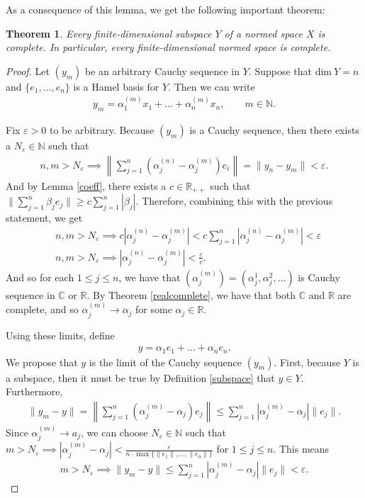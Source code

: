\documentclass[11pt]{article}
\theoremstyle{mystyle}
\newtheorem{thm}{Theorem}[section]
\newcommand{\0}{\mathbf{0}}
\begin{document}
As a consequence of this lemma, we get the following important theorem: 
\begin{thm}\label{finitecomplete}
Every finite-dimensional subspace $Y$ of a normed space $X$ is complete. In particular, every finite-dimensional normed space is complete.
\end{thm}
\begin{proof}
Let $(y_m)$ be an arbitrary Cauchy sequence in $Y$. Suppose that $\text{dim}\ Y = n$ and $\{e_1, \ldots, e_n\}$ is a Hamel basis for $Y$. Then we can write
\begin{align*}
    y_m = \alpha_1^{(m)}x_1 + \ldots + \alpha_n^{(m)}x_n, \qquad m \in \mathbb{N}. 
\end{align*}

Fix $\varepsilon > 0$ to be arbitrary. Because $(y_m)$ is a Cauchy sequence, then there exists a $N_{\varepsilon} \in \mathbb{N}$ such that
\begin{align*}
    n, m > N_{\varepsilon} \implies \left\|\sum_{j=1}^n (\alpha_j^{(n)} - \alpha_j^{(m)})e_i \right\| = \|y_n - y_m\| < \varepsilon.
\end{align*}
And by Lemma \ref{coeff}, there exists a $c \in \mathbb{R}_{++}$ such that $\|\sum_{j=1}^n \beta_j e_j\| \geq c\sum_{j=1}^n |\beta_j|$. Therefore, combining this with the previous statement, we get
\begin{align*}
    &n, m > N_{\varepsilon} \implies c|\alpha_j^{(n)} - \alpha_j^{(m)}| <  c\sum_{j=1}^n|\alpha_j^{(n)} - \alpha_j^{(m)}| < \varepsilon\\
    &n, m > N_{\varepsilon} \implies |\alpha_j^{(n)} - \alpha_j^{(m)}| < \frac{\varepsilon}{c}.
\end{align*}
And so for each $1 \leq j \leq n$, we have that $\left(\alpha_j^{(m)} \right) = (\alpha_j^{1}, \alpha_j^{2}, \ldots)$ is Cauchy sequence in $\mathbb{C}$ or $\mathbb{R}$. By Theorem \ref{realcomplete}, we have that both $\mathbb{C}$ and $\mathbb{R}$ are complete, and so $\alpha_j^{(m)} \longrightarrow \alpha_j$ for some $\alpha_j \in \mathbb{R}$. 

Using these limits, define 
\begin{align*}
    y = \alpha_1 e_1 + \ldots + \alpha_n e_n.
\end{align*}
We propose that $y$ is the limit of the Cauchy sequence $(y_m)$. First, because $Y$ is a subspace, then it must be true by Definition \ref{subspace} that $y \in Y$. Furthermore,
\begin{align*}
    \|y_m - y\| = \left\| \sum_{j=1}^n (\alpha_j^{(m)} - \alpha_j)e_j \right\| \leq \sum_{j=1}^n |\alpha_j^{(m)} - \alpha_j|\|e_j\|.
\end{align*}
Since $\alpha_j^{(m)} \longrightarrow a_j$, we can choose $N_{\varepsilon} \in \mathbb{N}$ such that $m > N_{\varepsilon} \implies |\alpha_j^{(m)} - \alpha_j| < \frac{\varepsilon}{n \cdot \max\{\|e_1\|, \ldots, \|e_n\|\}}$ for $1 \leq j \leq n$. This means
\begin{align*}
    m > N_{\varepsilon} \implies \|y_m - y\| \leq  \sum_{j=1}^n |\alpha_j^{(m)} - \alpha_j|\|e_j\| < \varepsilon.
\end{align*}


\end{proof}
\end{document}
